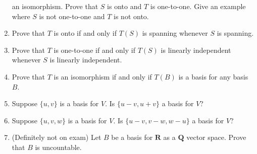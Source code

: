 \documentclass{article}
\begin{document}
\begin{enumerate}
        an isomorphism. Prove that $S$ is onto and $T$ is one-to-one. Give an
        example where $S$ is not one-to-one and $T$ is not onto.
    \item
        Prove that $T$ is onto if and only if $T(S)$ is spanning whenever $S$
        is spanning.
    \item
        Prove that $T$ is one-to-one if and only if $T(S)$ is linearly
        independent whenever $S$ is linearly independent.
    \item
        Prove that $T$ is an isomorphism if and only if $T(B)$ is a basis for
        any basis $B$.
    \item
        Suppose $\{u,v\}$ is a basis for $V$. Is $\{u-v,u+v\}$
        a basis for $V$?
    \item
        Suppose $\{u,v,w\}$ is a basis for $V$. Is $\{u-v,v-w,w-u\}$ a basis
        for $V$?
    \item
        (Definitely not on exam) Let $B$ be a basis for $\mathbf{R}$ as a
        $\mathbf{Q}$ vector space. Prove that $B$ is uncountable.
\end{enumerate}
\end{document}
